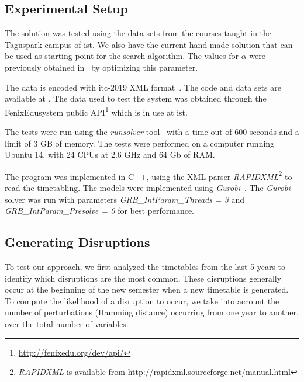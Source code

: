 \documentclass[twocolumn,natbib]{svjour3}          %
\begin{document}
\subsection{Experimental Setup}

The solution was tested using the data sets from the courses taught in the Taguspark campus of \gls{ist}. We also have the current hand-made solution that can be used as starting point for the search algorithm. The values for $\alpha$ were previously obtained in~\cite{LEMOS2018100092} by optimizing this parameter.

The data is encoded with \gls{itc}-2019 XML format~\citep{itc-2019}. The code and data sets are available at .
The data used to test the system was obtained through the FenixEdu\texttrademark system public API\footnote{\href{http://fenixedu.org/dev/api/}{http://fenixedu.org/dev/api/}} which is in use at \gls{ist}. 


The tests were run using the \textit{runsolver} tool~\citep{runsolver} with a time out of 600 seconds and a limit of 3 GB of memory. The tests were performed on a computer running Ubuntu 14, with 24 CPUs at 2.6 GHz and 64 Gb of RAM.

The program was implemented in C++, using the XML parser \textit{RAPIDXML}\footnote{\textit{RAPIDXML} is available from \url{http://rapidxml.sourceforge.net/manual.html}} to read the timetabling. The models were implemented using \textit{Gurobi}~\citep{gurobi}. The \textit{Gurobi} solver was run with parameters \textit{GRB\_IntParam\_Threads = 3} and \textit{GRB\_IntParam\_Presolve = 0} for best performance.




\subsection{Generating Disruptions}

To test our approach, we first analyzed the timetables from the last 5 years to identify which disruptions are the most common. These disruptions generally occur at the beginning of the new semester when a new timetable is generated. To compute the likelihood of a disruption to occur, we take into account the number of perturbations (Hamming distance) occurring from one year to another, over the total number of variables.  
\end{document}
